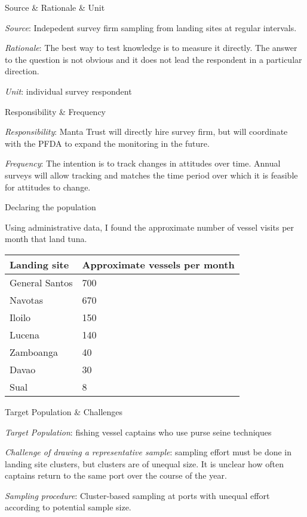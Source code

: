 \documentclass[ignorenonframetext,]{beamer}
\begin{document}
\begin{frame}{Source \& Rationale \& Unit}
\protect\hypertarget{source-rationale-unit}{}

\emph{Source}: Indepedent survey firm sampling from landing sites at
regular intervals.

\emph{Rationale}: The best way to test knowledge is to measure it
directly. The answer to the question is not obvious and it does not lead
the respondent in a particular direction.

\emph{Unit}: individual survey respondent

\end{frame}

\begin{frame}{Responsibility \& Frequency}
\protect\hypertarget{responsibility-frequency}{}

\emph{Responsibility}: Manta Trust will directly hire survey firm, but
will coordinate with the PFDA to expand the monitoring in the future.

\emph{Frequency}: The intention is to track changes in attitudes over
time. Annual surveys will allow tracking and matches the time period
over which it is feasible for attitudes to change.

\end{frame}

\begin{frame}{Declaring the population}
\protect\hypertarget{declaring-the-population}{}

Using administrative data, I found the approximate number of vessel
visits per month that land tuna.

\begin{longtable}[]{@{}ll@{}}
\toprule
Landing site & Approximate vessels per month\tabularnewline
\midrule
\endhead
General Santos & 700\tabularnewline
Navotas & 670\tabularnewline
Iloilo & 150\tabularnewline
Lucena & 140\tabularnewline
Zamboanga & 40\tabularnewline
Davao & 30\tabularnewline
Sual & 8\tabularnewline
\bottomrule
\end{longtable}

\end{frame}

\begin{frame}{Target Population \& Challenges}
\protect\hypertarget{target-population-challenges}{}

\emph{Target Population}: fishing vessel captains who use purse seine
techniques

\emph{Challenge of drawing a representative sample}: sampling effort
must be done in landing site clusters, but clusters are of unequal size.
It is unclear how often captains return to the same port over the course
of the year.

\emph{Sampling procedure}: Cluster-based sampling at ports with unequal
effort according to potential sample size.

\end{frame}
\end{document}
